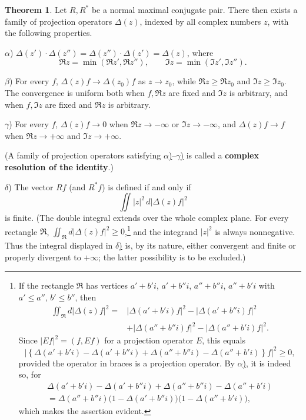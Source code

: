 \documentclass[
  paper=b5,
  twoside=true,
  fontsize=13pt,
  headings=normal,
  bookmarkpackage=false
]{scrartcl}
\theoremstyle{definition}
\newtheorem{theorem}{Theorem}
\begin{document}
\begin{theorem}\label{thm:17}
Let \(R,R^*\) be a normal maximal conjugate pair.  There then exists a
family of projection operators \(\Delta(z)\), indexed by all complex
numbers \(z\), with the following properties.

\label{thm:17:alpha}%
\(\alpha\))
\(\Delta(z')\cdot\Delta(z'')=\Delta(z'')\cdot\Delta(z')=\Delta(z)\),
where
\[
  \Re z=\min(\Re z',
  \Re z''),\qquad
  \Im z=\min(\Im z',
  \Im z'').
\]

\label{thm:17:beta}%
\(\beta\)) For every \(f\), \(\Delta(z)f\to\Delta(z_0)f\)
as \(z\to z_0\), while
\(\Re z\geq\Re z_0\) and
\(\Im z\geq\Im z_0\).  The convergence is
uniform both when \(f,\Re z\) are fixed and
\(\Im z\) is arbitrary, and when
\(f,\Im z\) are fixed and \(\Re z\) is
arbitrary.

\label{thm:17:gamma}%
\(\gamma\)) For every \(f\), \(\Delta(z)f\to0\)
when \(\Re z\to-\infty\) or
\(\Im z\to-\infty\), and \(\Delta(z)f\to f\)
when \(\Re z\to+\infty\) and
\(\Im z\to+\infty\).

(A family of projection operators satisfying \hyperref[thm:17:alpha]{\(\alpha\))}--\hyperref[thm:17:gamma]{\(\gamma\))}
is called a \textbf{complex resolution of the identity}.)

\label{thm:17:delta}%
\(\delta\)) The vector \(Rf\) (and \(R^*f\)) is defined if and only if
\[
  \iint|z|^2\,d\lvert\Delta(z)f\rvert^2
\]
is finite. (The double integral extends over the whole complex plane.
For every rectangle \(\mathfrak R\),
\(\iint_{\mathfrak R}d\lvert\Delta(z)f\rvert^2\geq0\),\footnote{\label{fn:66}
If the rectangle \(\mathfrak R\) has vertices \(a'+b'i\), \(a'+b''i\),
\(a''+b''i\), \(a''+b'i\) with \(a'\leq a''\), \(b'\leq b''\), then
\begin{align*}
  \iint_{\mathfrak R}d\lvert\Delta(z)f\rvert^2
  ={}&\lvert\Delta(a'+b'i)f\rvert^2
     -\lvert\Delta(a'+b''i)f\rvert^2\\
    &+\lvert\Delta(a''+b''i)f\rvert^2
     -\lvert\Delta(a''+b'i)f\rvert^2.
\end{align*}
Since \(\lvert Ef\rvert^2=(f,Ef)\) for a projection operator \(E\),
this equals
\[
  \left|
  \left\{
  \Delta(a'+b'i)-\Delta(a'+b''i)
  +\Delta(a''+b''i)-\Delta(a''+b'i)
  \right\}f\right|^2\geq0,
\]
provided the operator in braces is a projection operator.  By
\hyperref[thm:17:alpha]{\(\alpha\))}, it is indeed so, for
\begin{multline*}
  \Delta(a'+b'i)-\Delta(a'+b''i)
  +\Delta(a''+b''i)-\Delta(a''+b'i)\\
  =
  \Delta(a''+b''i)
  \bigl(1-\Delta(a'+b''i)\bigr)
  \bigl(1-\Delta(a''+b'i)\bigr),
\end{multline*}
which makes the assertion evident.}
and the integrand \(|z|^2\) is always nonnegative.  Thus the integral
displayed in \hyperref[thm:17:delta]{\(\delta\))} is, by its nature, either convergent and
finite or properly divergent to \(+\infty\); the latter possibility is
to be excluded.)


\end{theorem}
\end{document}
